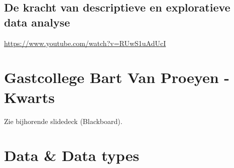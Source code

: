 \documentclass[]{tufte-book}
\begin{document}
\hypertarget{de-kracht-van-descriptieve-en-exploratieve-data-analyse}{%
\subsection{De kracht van descriptieve en exploratieve data analyse}\label{de-kracht-van-descriptieve-en-exploratieve-data-analyse}}

\url{https://www.youtube.com/watch?v=RUwS1uAdUcI}

\hypertarget{gastcollege-bart-van-proeyen---kwarts}{%
\section{Gastcollege Bart Van Proeyen - Kwarts}\label{gastcollege-bart-van-proeyen---kwarts}}

Zie bijhorende slidedeck (Blackboard).

\hypertarget{data-data-types}{%
\section{Data \& Data types}\label{data-data-types}}
\end{document}
